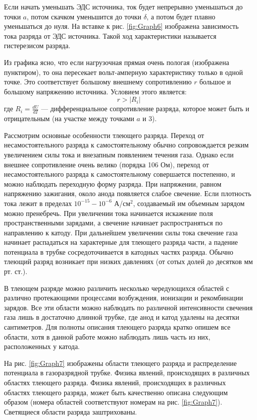 \documentclass[a4paper, 12pt]{article}
\begin{document}
	Если начать уменьшать ЭДС источника, ток будет непрерывно уменьшаться до точки $a$, потом скачком уменьшится до точки $\delta$, а потом будет плавно уменьшаться до нуля. На вставке к рис. \ref{fig:Graph6} изображена зависимость тока разряда от ЭДС источника. Такой ход характеристики называется гистерезисом разряда.\par
	Из графика ясно, что если нагрузочная прямая очень пологая (изображена пунктиром), то она пересекает вольт-амперную характеристику только в одной точке. Это соответствует большому внешнему сопротивлению $r$ большое и большому напряжению источника. Условием этого является:
	\begin{equation}
		r>\left|R_i\right|
	\end{equation}
	где $R_i=\frac{dU}{dI}$ — дифференциальное сопротивление разряда, которое может быть и отрицательным (на участке между точками $a$ и 3).\par
	Рассмотрим основные особенности тлеющего разряда. Переход от несамостоятельного разряда к самостоятельному обычно сопровождается резким увеличением силы тока и внезапным появлением течения газа. Однако если внешнее сопротивление очень велико (порядка 106 Ом), переход от несамостоятельного разряда к самостоятельному совершается постепенно, и можно наблюдать переходную форму разряда. При напряжении, равном напряжению зажигания, около анода появляется слабое свечение. Если плотность тока лежит в пределах $10^{-15}-10^{-6}$ А/см$^2$, создаваемый им объемным зарядом можно пренебречь. При увеличении тока начинается искажение поля пространственными зарядами, а свечение начинает распространяться по направлению к катоду. При дальнейшем увеличении силы тока свечение газа начинает распадаться на характерные для тлеющего разряда части, а падение потенциала в трубке сосредоточивается в катодных частях разряда. Обычно тлеющий разряд возникает при низких давлениях (от сотых долей до десятков мм рт. ст.).\par
	В тлеющем разряде можно различить несколько чередующихся областей с различно протекающими процессами возбуждения, ионизации и рекомбинации зарядов. Все эти области можно наблюдать по различной интенсивности свечения газа лишь в достаточно длинной трубке, где анод и катод удалены на десятки сантиметров. Для полноты описания тлеющего разряда кратко опишем все области, хотя в данной работе можно наблюдать лишь часть из них, расположенных у катода.\par
	На рис. \ref{fig:Graph7} изображены области тлеющего разряда и распределение потенциала в газоразрядной трубке. Физика явлений, происходящих в различных областях тлеющего разряда. Физика явлений, происходящих в различных областях тлеющего разряда, может быть качественно описана следующим образом (номера областей соответствуют номерам на рис. \ref{fig:Graph7}). Светящиеся области разряда заштрихованы.\par
\end{document}

